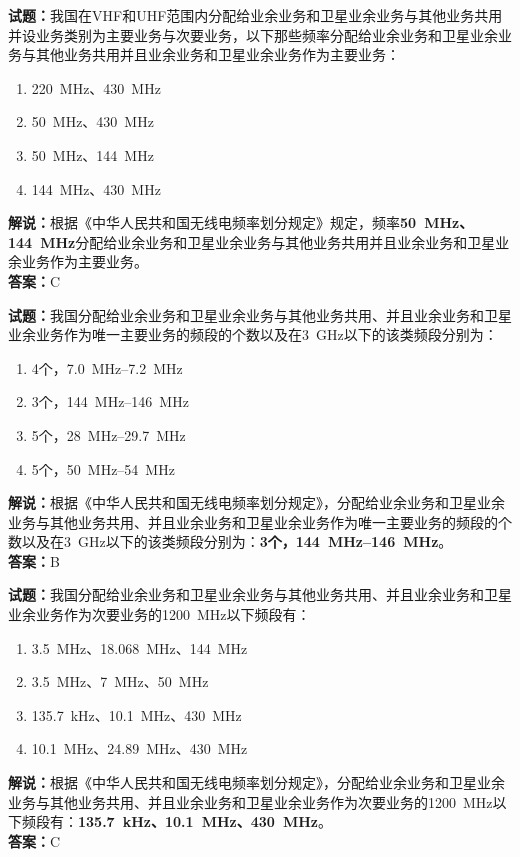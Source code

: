 \documentclass{ctexbook}
\begin{document}
\bigskip

\noindent\textbf{试题：}我国在VHF和UHF范围内分配给业余业务和卫星业余业务与其他业务共用并设业务类别为主要业务与次要业务，以下那些频率分配给业余业务和卫星业余业务与其他业务共用并且业余业务和卫星业余业务作为主要业务：
\begin{enumerate}[leftmargin=3em]
  \item \qty{220}{\MHz}、\qty{430}{\MHz}
  \item \qty{50}{\MHz}、\qty{430}{\MHz}
  \item \qty{50}{\MHz}、\qty{144}{\MHz}
  \item \qty{144}{\MHz}、\qty{430}{\MHz}
\end{enumerate}
\noindent\textbf{解说：}根据《中华人民共和国无线电频率划分规定》规定，频率\textbf{\qty{50}{\MHz}、\qty{144}{\MHz}}分配给业余业务和卫星业余业务与其他业务共用并且业余业务和卫星业余业务作为主要业务。\\\noindent\textbf{答案：}C

\bigskip

\noindent\textbf{试题：}我国分配给业余业务和卫星业余业务与其他业务共用、并且业余业务和卫星业余业务作为唯一主要业务的频段的个数以及在\qty{3}{\GHz}以下的该类频段分别为：
\begin{enumerate}[leftmargin=3em]
  \item 4个，\qtyrange[range-phrase=--]{7.0}{7.2}{\MHz}
  \item 3个，\qtyrange[range-phrase=--]{144}{146}{\MHz}
  \item 5个，\qtyrange[range-phrase=--]{28}{29.7}{\MHz}
  \item 5个，\qtyrange[range-phrase=--]{50}{54}{\MHz}
\end{enumerate}
\noindent\textbf{解说：}根据《中华人民共和国无线电频率划分规定》，分配给业余业务和卫星业余业务与其他业务共用、并且业余业务和卫星业余业务作为唯一主要业务的频段的个数以及在\qty{3}{\GHz}以下的该类频段分别为：\textbf{3个，\qtyrange[range-phrase=--]{144}{146}{\MHz}}。\\\noindent\textbf{答案：}B

\bigskip

\noindent\textbf{试题：}我国分配给业余业务和卫星业余业务与其他业务共用、并且业余业务和卫星业余业务作为次要业务的\qty{1200}{\MHz}以下频段有：
\begin{enumerate}[leftmargin=3em]
  \item \qty{3.5}{\MHz}、\qty{18.068}{\MHz}、\qty{144}{\MHz}
  \item \qty{3.5}{\MHz}、\qty{7}{\MHz}、\qty{50}{\MHz}
  \item \qty{135.7}{\kHz}、\qty{10.1}{\MHz}、\qty{430}{\MHz}
  \item \qty{10.1}{\MHz}、\qty{24.89}{\MHz}、\qty{430}{\MHz}
\end{enumerate}
\noindent\textbf{解说：}根据《中华人民共和国无线电频率划分规定》，分配给业余业务和卫星业余业务与其他业务共用、并且业余业务和卫星业余业务作为次要业务的\qty{1200}{\MHz}以下频段有：\textbf{\qty{135.7}{\kHz}、\qty{10.1}{\MHz}、\qty{430}{\MHz}}。\\\noindent\textbf{答案：}C
\end{document}
